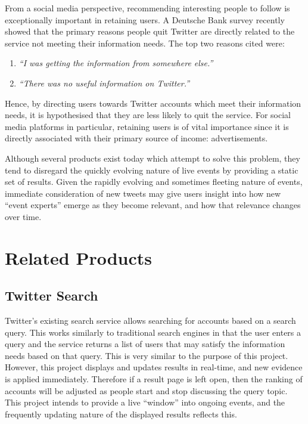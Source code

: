 \documentclass{l4proj}
\begin{document}
From a social media perspective, recommending interesting people to follow is exceptionally important in retaining users. A Deutsche Bank survey recently showed that the primary reasons people quit Twitter are directly related to the service not meeting their information needs. The top two reasons cited were:

\begin{enumerate}
    \item \textit{``I was getting the information from somewhere else.'' }
    \item \textit{``There was no useful information on Twitter.''}
\end{enumerate}

Hence, by directing users towards Twitter accounts which meet their information needs, it is hypothesised that they are less likely to quit the service. For social media platforms in particular, retaining users is of vital importance since it is directly associated with their primary source of income: advertisements.

Although several products exist today which attempt to solve this problem, they tend to disregard the quickly evolving nature of live events by providing a static set of results. Given the rapidly evolving and sometimes fleeting nature of events, immediate consideration of new tweets may give users insight into how new ``event experts'' emerge as they become relevant, and how that relevance changes over time.

\section{Related Products}

\subsection{Twitter Search}
Twitter's existing search service allows searching for accounts based on a search query. This works similarly to traditional search engines in that the user enters a query and the service returns a list of users that may satisfy the information needs based on that query. This is very similar to the purpose of this project. However, this project displays and updates results in real-time, and new evidence is applied immediately. Therefore if a result page is left open, then the ranking of accounts will be adjusted as people start and stop discussing the query topic. This project intends to provide a live ``window'' into ongoing events, and the frequently updating nature of the displayed results reflects this.
\end{document}
